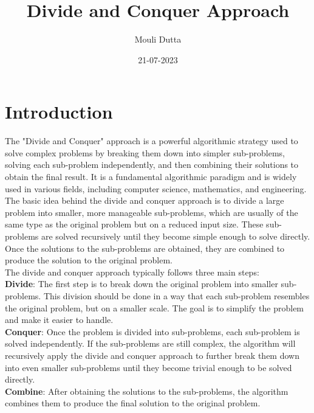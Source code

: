 \documentclass[a4paper, 12pt]{report}
\title{Divide and Conquer Approach}
\author{Mouli Dutta}
\date{21-07-2023}
\begin{document}
    \maketitle
    \tableofcontents
    \newpage
    
    \section{Introduction}

    The "Divide and Conquer" approach is a powerful algorithmic strategy used to solve complex problems by breaking them down into simpler sub-problems, solving each sub-problem independently, and then combining their solutions to obtain the final result. It is a fundamental algorithmic paradigm and is widely used in various fields, including computer science, mathematics, and engineering.\\
    
    The basic idea behind the divide and conquer approach is to divide a large problem into smaller, more manageable sub-problems, which are usually of the same type as the original problem but on a reduced input size. These sub-problems are solved recursively until they become simple enough to solve directly. Once the solutions to the sub-problems are obtained, they are combined to produce the solution to the original problem.\\

    The divide and conquer approach typically follows three main steps:\\

    \textbf{Divide}: The first step is to break down the original problem into smaller sub-problems. This division should be done in a way that each sub-problem resembles the original problem, but on a smaller scale. The goal is to simplify the problem and make it easier to handle.\\

    \textbf{Conquer}: Once the problem is divided into sub-problems, each sub-problem is solved independently. If the sub-problems are still complex, the algorithm will recursively apply the divide and conquer approach to further break them down into even smaller sub-problems until they become trivial enough to be solved directly.\\

    \textbf{Combine}: After obtaining the solutions to the sub-problems, the algorithm combines them to produce the final solution to the original problem.\\ \\
\end{document}

